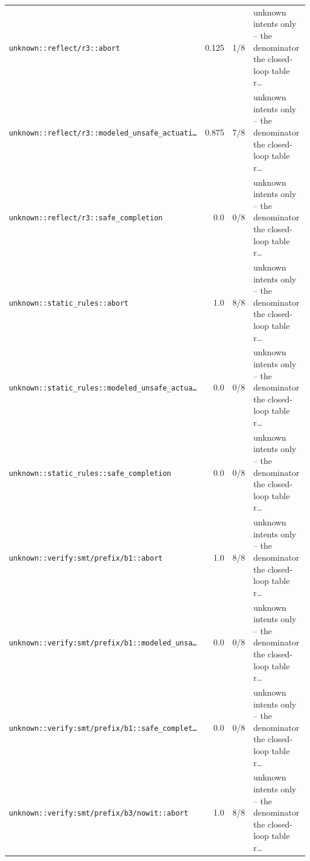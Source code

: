 \begin{center}
\begin{longtable}{@{}p{}rrp{}@{}}
\texttt{\scriptsize unknown:\allowbreak :\allowbreak reflect/\allowbreak r3:\allowbreak :\allowbreak abort} & 0.125 & 1/8 & unknown intents only -- the denominator the closed-loop table r… \\
\texttt{\scriptsize unknown:\allowbreak :\allowbreak reflect/\allowbreak r3:\allowbreak :\allowbreak modeled\_\allowbreak unsafe\_\allowbreak actuati…} & 0.875 & 7/8 & unknown intents only -- the denominator the closed-loop table r… \\
\texttt{\scriptsize unknown:\allowbreak :\allowbreak reflect/\allowbreak r3:\allowbreak :\allowbreak safe\_\allowbreak completion} & 0.0 & 0/8 & unknown intents only -- the denominator the closed-loop table r… \\
\texttt{\scriptsize unknown:\allowbreak :\allowbreak static\_\allowbreak rules:\allowbreak :\allowbreak abort} & 1.0 & 8/8 & unknown intents only -- the denominator the closed-loop table r… \\
\texttt{\scriptsize unknown:\allowbreak :\allowbreak static\_\allowbreak rules:\allowbreak :\allowbreak modeled\_\allowbreak unsafe\_\allowbreak actua…} & 0.0 & 0/8 & unknown intents only -- the denominator the closed-loop table r… \\
\texttt{\scriptsize unknown:\allowbreak :\allowbreak static\_\allowbreak rules:\allowbreak :\allowbreak safe\_\allowbreak completion} & 0.0 & 0/8 & unknown intents only -- the denominator the closed-loop table r… \\
\texttt{\scriptsize unknown:\allowbreak :\allowbreak verify:\allowbreak smt/\allowbreak prefix/\allowbreak b1:\allowbreak :\allowbreak abort} & 1.0 & 8/8 & unknown intents only -- the denominator the closed-loop table r… \\
\texttt{\scriptsize unknown:\allowbreak :\allowbreak verify:\allowbreak smt/\allowbreak prefix/\allowbreak b1:\allowbreak :\allowbreak modeled\_\allowbreak unsa…} & 0.0 & 0/8 & unknown intents only -- the denominator the closed-loop table r… \\
\texttt{\scriptsize unknown:\allowbreak :\allowbreak verify:\allowbreak smt/\allowbreak prefix/\allowbreak b1:\allowbreak :\allowbreak safe\_\allowbreak complet…} & 0.0 & 0/8 & unknown intents only -- the denominator the closed-loop table r… \\
\texttt{\scriptsize unknown:\allowbreak :\allowbreak verify:\allowbreak smt/\allowbreak prefix/\allowbreak b3/\allowbreak nowit:\allowbreak :\allowbreak abort} & 1.0 & 8/8 & unknown intents only -- the denominator the closed-loop table r… \\

\end{longtable}
\end{center}
